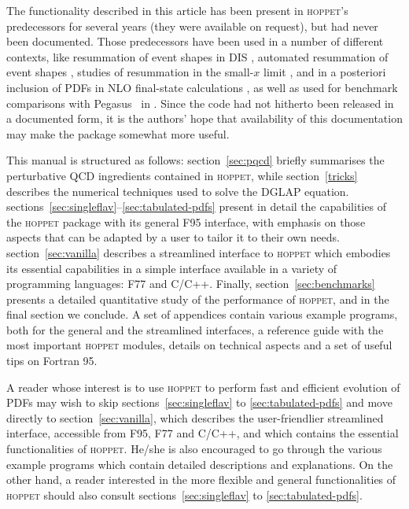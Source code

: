 \documentclass[12pt]{article}
\newcommand{\hoppet}{\textsc{hoppet}\xspace}
\begin{document}
The functionality described in this article has been present in
\hoppet's predecessors for several years (they were available on
request), but had
never been documented. 
Those predecessors have  been used in a number of different
contexts, like resummation of event shapes
in DIS \cite{Dasgupta:2001eq,Dasgupta:2002dc}, automated resummation
of event shapes \cite{caesar}, studies of
resummation in the small-$x$ limit \cite{Ciafaloni:2003rd}, 
and in a posteriori inclusion
of PDFs in NLO final-state calculations \cite{Carli:2005ji,Carli:2010rw,Banfi:2007gu}, as well
as  used for benchmark
comparisons with Pegasus~\cite{Pegasus} in \cite{Giele:2002hx,Dittmar:2005ed}.
Since the code had
not hitherto been released in a documented form, 
it is the authors' hope that availability of
this documentation may make the package somewhat more useful.

This manual is structured as follows: section~\ref{sec:pqcd}
briefly summarises the perturbative QCD ingredients contained in
\hoppet, while section~\ref{tricks} describes the numerical techniques
used to solve the DGLAP equation. 
sections~\ref{sec:singleflav}--\ref{sec:tabulated-pdfs} present in detail the capabilities
of the \hoppet package with its general F95 interface, 
with emphasis on those aspects that
can be adapted by a user to tailor it to their own needs. 
section~\ref{sec:vanilla} describes a streamlined interface
to \hoppet which embodies its essential capabilities in
a simple interface available in a variety of programming languages: 
F77 and C/C++.
Finally, section~\ref{sec:benchmarks} presents a detailed 
quantitative study of
the performance of \hoppet, and in the final section we conclude.
A set of appendices contain various example programs,
both for the general and the streamlined interfaces, a reference
guide with the most important \hoppet modules,
details on technical aspects and a set of useful tips on
Fortran 95. 


A reader 
whose interest is to use \hoppet to perform
fast and efficient evolution of PDFs 
may wish to skip 
sections~\ref{sec:singleflav} to \ref{sec:tabulated-pdfs}
and move directly to
 section~\ref{sec:vanilla}, which describes the 
user-friendlier streamlined interface,
accessible from F95, F77 and C/C++, and which contains the essential
functionalities of \hoppet. He/she is also encouraged to go through the
various example programs which contain detailed 
descriptions and explanations. 
On the other hand, a reader interested in the
more flexible and general 
functionalities of \hoppet should also consult
sections~\ref{sec:singleflav} to \ref{sec:tabulated-pdfs}. 
\end{document}

